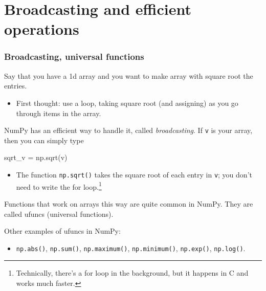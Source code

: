 \documentclass{beamer}
\newenvironment{codeblock}
    {\hfill\begin{beamerboxesrounded}[lower=codecol, width=0.8\textwidth]
    \medskip

    }
    { 
    \end{beamerboxesrounded}\hfill
    }
\theoremstyle{example}
\newcommand{\ttt}[1]{{\small\texttt{#1}}}
\begin{document}
\section{Broadcasting and efficient operations}
\begin{frame}[fragile]
\frametitle{Broadcasting, universal functions}
Say that you have a 1d array and you want to make array with square root the entries. 
\begin{itemize}
    \item[] First thought: use a loop, taking square root (and assigning) as you go through items in the array.
\end{itemize}

NumPy has an efficient way to handle it, called \emph{broadcasting}. If \ttt{v} is your array, then you can simply type 

\begin{codeblock}

\begin{python}[numbers=none]
sqrt_v = np.sqrt(v)
\end{python}

\end{codeblock}

\begin{itemize}
    \item[] The function \ttt{np.sqrt()} takes the square root of each entry in \ttt{v}; you don't need to write the for loop.\footnote{Technically, there's a for loop in the background, but it happens in C and works much faster.}
\end{itemize}
Functions that work on arrays this way are quite common in NumPy. They are called {\ttb ufuncs} (universal functions).

Other examples of ufuncs in NumPy: 
    \begin{itemize}
        \item[] \ttt{np.abs()}, \ttt{np.sum()}, \ttt{np.maximum()}, \ttt{np.minimum()}, \ttt{np.exp()}, \ttt{np.log()}.
    \end{itemize}
\end{frame}
\end{document}

